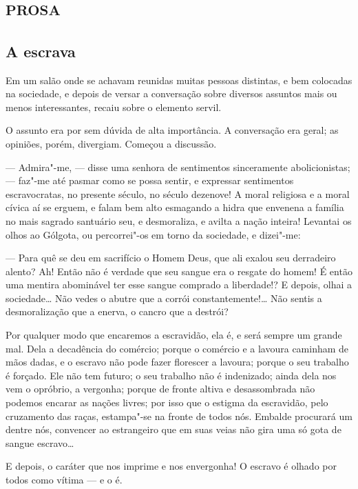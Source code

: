 \part{\textsc{prosa}}

\chapter{A escrava}

Em um salão onde se achavam reunidas muitas pessoas distintas, e bem
colocadas na sociedade, e depois de versar a conversação sobre diversos
assuntos mais ou menos interessantes, recaiu sobre o elemento servil.

O assunto era por sem dúvida de alta importância. A conversação era
geral; as opiniões, porém, divergiam. Começou a discussão.

--- Admira"-me, --- disse uma senhora de sentimentos sinceramente
abolicionistas; --- faz"-me até pasmar como se possa sentir, e expressar
sentimentos escravocratas, no presente século, no século dezenove! A
moral religiosa e a moral cívica aí se erguem, e falam bem alto
esmagando a hidra que envenena a família no mais sagrado santuário seu,
e desmoraliza, e avilta a nação inteira! Levantai os olhos ao Gólgota,
ou percorrei"-os em torno da sociedade, e dizei"-me:

--- Para quê se deu em sacrifício o Homem Deus, que ali exalou seu
derradeiro alento? Ah! Então não é verdade que seu sangue era o resgate
do homem! É então uma mentira abominável ter esse sangue comprado a
liberdade!? E depois, olhai a sociedade\ldots{} Não vedes o abutre que a
corrói constantemente!\ldots{} Não sentis a desmoralização que a enerva, o
cancro que a destrói?

Por qualquer modo que encaremos a escravidão, ela é, e será sempre um
grande mal. Dela a decadência do comércio; porque o comércio e a lavoura
caminham de mãos dadas, e o escravo não pode fazer florescer a lavoura;
porque o seu trabalho é forçado. Ele não tem futuro; o seu trabalho não
é indenizado; ainda dela nos vem o opróbrio, a vergonha; porque de
fronte altiva e desassombrada não podemos encarar as nações livres; por
isso que o estigma da escravidão, pelo cruzamento das raças, estampa"-se
na fronte de todos nós. Embalde procurará um dentre nós, convencer ao
estrangeiro que em suas veias não gira uma só gota de sangue escravo\ldots{}

E depois, o caráter que nos imprime e nos envergonha! O escravo é olhado
por todos como vítima --- e o é.

